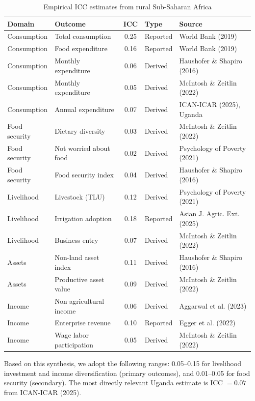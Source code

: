 \documentclass[12pt, oneside]{amsart}
\numberwithin{equation}{section}
\begin{document}
\begin{table}[H]
\centering
\small
\caption{Empirical ICC estimates from rural Sub-Saharan Africa}
\label{tab:icc}
\begin{tabular}{llcll}
\toprule
Domain & Outcome & ICC & Type & Source \\
\midrule
Consumption & Total consumption & 0.25 & Reported & World Bank (2019) \\
Consumption & Food expenditure & 0.16 & Reported & World Bank (2019) \\
Consumption & Monthly expenditure & 0.06 & Derived & Haushofer \& Shapiro (2016) \\
Consumption & Monthly expenditure & 0.05 & Derived & McIntosh \& Zeitlin (2022) \\
Consumption & Annual expenditure & 0.07 & Derived & ICAN-ICAR (2025), Uganda \\
\midrule
Food security & Dietary diversity & 0.03 & Derived & McIntosh \& Zeitlin (2022) \\
Food security & Not worried about food & 0.02 & Derived & Psychology of Poverty (2021) \\
Food security & Food security index & 0.04 & Derived & Haushofer \& Shapiro (2016) \\
\midrule
Livelihood & Livestock (TLU) & 0.12 & Derived & Psychology of Poverty (2021) \\
Livelihood & Irrigation adoption & 0.18 & Reported & Asian J. Agric. Ext. (2025) \\
Livelihood & Business entry & 0.07 & Derived & McIntosh \& Zeitlin (2022) \\
\midrule
Assets & Non-land asset index & 0.11 & Derived & Haushofer \& Shapiro (2016) \\
Assets & Productive asset value & 0.09 & Derived & McIntosh \& Zeitlin (2022) \\
\midrule
Income & Non-agricultural income & 0.06 & Derived & Aggarwal et al. (2023) \\
Income & Enterprise revenue & 0.10 & Reported & Egger et al. (2022) \\
Income & Wage labor participation & 0.05 & Derived & McIntosh \& Zeitlin (2022) \\
\bottomrule
\end{tabular}
\end{table}

Based on this synthesis, we adopt the following ranges: 0.05--0.15 for livelihood investment and income diversification (primary outcomes), and 0.01--0.05 for food security (secondary). The most directly relevant Uganda estimate is ICC $= 0.07$ from ICAN-ICAR (2025).
\end{document}

